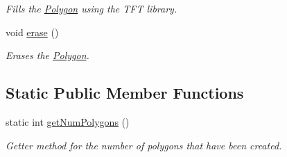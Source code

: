 \begin{DoxyCompactItemize}
\begin{DoxyCompactList}\small\item\em Fills the \hyperlink{class_polygon}{Polygon} using the T\+F\+T library. \end{DoxyCompactList}\item 
\hypertarget{class_polygon_a1b7e1ed1a790c4e002b174373fd4a295}{void \hyperlink{class_polygon_a1b7e1ed1a790c4e002b174373fd4a295}{erase} ()}\label{class_polygon_a1b7e1ed1a790c4e002b174373fd4a295}

\begin{DoxyCompactList}\small\item\em Erases the \hyperlink{class_polygon}{Polygon}. \end{DoxyCompactList}\end{DoxyCompactItemize}
\subsection*{Static Public Member Functions}
\begin{DoxyCompactItemize}
\item 
\hypertarget{class_polygon_a1767ac5482d2bd85e8826aacf7214ee5}{static int \hyperlink{class_polygon_a1767ac5482d2bd85e8826aacf7214ee5}{get\+Num\+Polygons} ()}\label{class_polygon_a1767ac5482d2bd85e8826aacf7214ee5}

\begin{DoxyCompactList}\small\item\em Getter method for the number of polygons that have been created. \end{DoxyCompactList}\end{DoxyCompactItemize}
